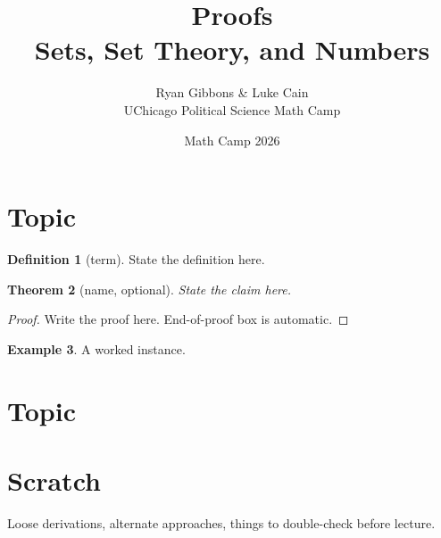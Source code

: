 \documentclass[11pt]{article}
\title{Proofs \\[0.35em] \large Sets, Set Theory, and Numbers}
\author{Ryan Gibbons \& Luke Cain \\ UChicago Political Science Math Camp}
\date{Math Camp 2026}
\theoremstyle{plain}
\newtheorem{theorem}{Theorem}[section]
\newtheorem{lemma}[theorem]{Lemma}
\theoremstyle{definition}
\newtheorem{definition}[theorem]{Definition}
\newtheorem{example}[theorem]{Example}
\theoremstyle{remark}
\begin{document}
\maketitle


\section{Topic}

\begin{definition}[term]
State the definition here.
\end{definition}

\begin{theorem}[name, optional]
State the claim here.
\end{theorem}

\begin{proof}
Write the proof here.  End-of-proof box is automatic.
\end{proof}

\begin{example}
A worked instance.
\end{example}


\section{Topic}



\section*{Scratch}

Loose derivations, alternate approaches, things to double-check before lecture.
\end{document}
